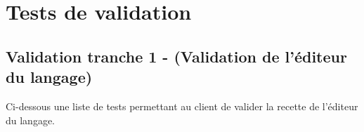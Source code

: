 \documentclass[12pt, openany]{report}
\begin{document}
%
%


\chapter{Tests de validation}
\section{Validation tranche 1 -  (Validation de l'éditeur du langage)} 
Ci-dessous une liste de tests permettant au client de valider la recette de l'éditeur du langage.\bigbreak
\end{document}
